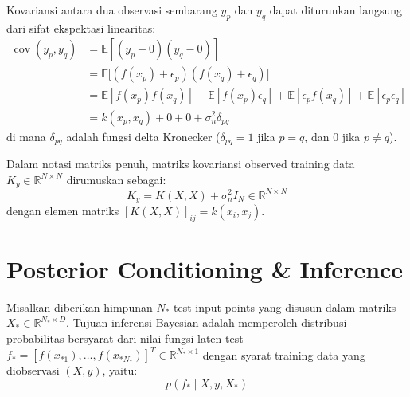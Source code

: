 \documentclass[11pt,a4paper]{article}
\def\mathbf#1{#1}%
\begin{document}
Kovariansi antara dua observasi sembarang $y_p$ dan $y_q$ dapat diturunkan langsung dari sifat ekspektasi linearitas:
\begin{align}
\operatorname{cov}(y_p, y_q) &= \mathbb{E}[(y_p - 0)(y_q - 0)] \nonumber \\
&= \mathbb{E}\big[ (f(\mathbf{x}_p) + \epsilon_p)(f(\mathbf{x}_q) + \epsilon_q) \big] \nonumber \\
&= \mathbb{E}[f(\mathbf{x}_p)f(\mathbf{x}_q)] + \mathbb{E}[f(\mathbf{x}_p)\epsilon_q] + \mathbb{E}[\epsilon_p f(\mathbf{x}_q)] + \mathbb{E}[\epsilon_p \epsilon_q] \nonumber \\
&= k(\mathbf{x}_p, \mathbf{x}_q) + 0 + 0 + \sigma_n^2 \delta_{pq}
\end{align}
di mana $\delta_{pq}$ adalah fungsi delta Kronecker ($\delta_{pq} = 1$ jika $p=q$, dan $0$ jika $p \neq q$).

Dalam notasi matriks penuh, matriks kovariansi observed training data $K_y \in \mathbb{R}^{N \times N}$ dirumuskan sebagai:
\begin{equation}
\label{eq:Ky}
K_y = K(X, X) + \sigma_n^2 I_N \in \mathbb{R}^{N \times N}
\end{equation}
dengan elemen matriks $[K(X, X)]_{ij} = k(\mathbf{x}_i, \mathbf{x}_j)$.

\section{Posterior Conditioning \& Inference}
\label{sec:conditioning}

Misalkan diberikan himpunan $N_*$ test input points yang disusun dalam matriks $X_* \in \mathbb{R}^{N_* \times D}$. Tujuan inferensi Bayesian adalah memperoleh distribusi probabilitas bersyarat dari nilai fungsi laten test $\mathbf{f}_* = [f(\mathbf{x}_{*1}), \dots, f(\mathbf{x}_{*N_*})]^T \in \mathbb{R}^{N_* \times 1}$ dengan syarat training data yang diobservasi $(X, \mathbf{y})$, yaitu:
\begin{equation}
p(\mathbf{f}_* \mid X, \mathbf{y}, X_*)
\end{equation}
\end{document}

